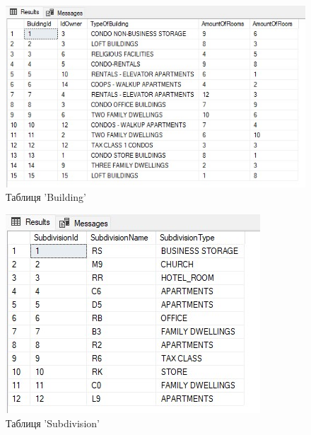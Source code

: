 \documentclass[a4paper,12pt]{article}
\begin{document}
	\begin{figure}[h!]
		\centering
		\begin{minipage}[h]{1\linewidth}
			\includegraphics[width=0.8\linewidth]{Prt sc/Figure_2.jpg}  
		\end{minipage}
		\caption{Таблиця 'Building'}
	\end{figure}
	
	\begin{figure}[h!]
		\centering
		\begin{minipage}[h]{1\linewidth}
			\includegraphics[width=0.8\linewidth]{Prt sc/Figure_3.jpg}  
		\end{minipage}
		\caption{Таблиця 'Subdivision'}
	\end{figure}
\end{document}
